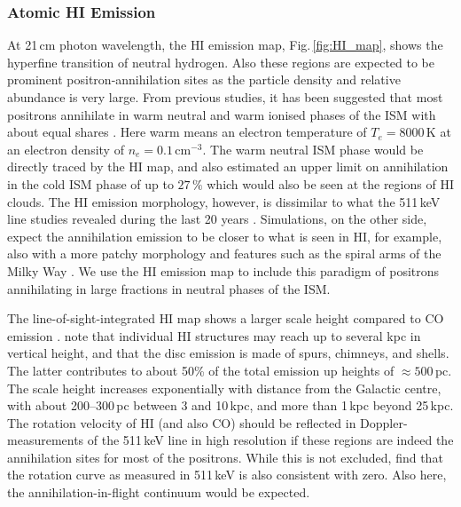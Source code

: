 \documentclass[doublespace,nopageskip]{VTthesis}
\newcommand{\mrm}[1]{\mathrm{#1}}
\begin{document}
\subsubsection{Atomic HI Emission}

At 21\,cm photon wavelength, the {HI} emission map, Fig.\,\ref{fig:HI_map}, shows the hyperfine transition of neutral hydrogen.
%
Also these regions are expected to be prominent positron-annihilation sites as the particle density and relative abundance is very large.
%
From previous studies, it has been suggested that most positrons annihilate in warm neutral and warm ionised phases of the ISM with about equal shares \citep{2006A&A...445..579J}.
%
Here warm means an electron temperature of $T_e = 8000\,\mrm{K}$ at an electron density of $n_e = 0.1\,\mrm{cm^{-3}}$.
%
The warm neutral ISM phase would be directly traced by the {HI} map, and \citet{2006A&A...445..579J} also estimated an upper limit on annihilation in the cold ISM phase of up to $27\,\%$ which would also be seen at the regions of {HI} clouds.
%
The {HI} emission morphology, however, is dissimilar to what the 511\,keV line studies revealed during the last 20 years \citep{1997ApJ...491..725P,2005A&A...441..513K,2016A&A...586A..84S,2019A&A...627A.126S,Skinner2014_511,2011MNRAS.411.1727C}.
%
Simulations, on the other side, expect the annihilation emission to be closer to what is seen in {HI}, for example, also with a more patchy morphology and features such as the spiral arms of the Milky Way \citep{2014A&A...564A.108A,2018Galax...6...39P}.
%
We use the {HI} emission map to include this paradigm of positrons annihilating in large fractions in neutral phases of the ISM. 

The line-of-sight-integrated {HI} map shows a larger scale height compared to {CO} emission \citep{1990ARA&A..28..215D}.
%
\citet{2009ARA&A..47...27K} note that individual {HI} structures may reach up to several kpc in vertical height, and that the disc emission is made of spurs, chimneys, and shells.
%
The latter contributes to about 50\% of the total emission up heights of $\approx 500$\,pc.
%
The scale height increases exponentially with distance from the Galactic centre, with about 200--300\,pc between 3 and 10\,kpc, and more than 1\,kpc beyond 25\,kpc.
%
The rotation velocity of {HI} (and also {CO}) should be reflected in Doppler-measurements of the 511\,keV line in high resolution if these regions are indeed the annihilation sites for most of the positrons.
%
While this is not excluded, \citet{2019A&A...627A.126S} find that the rotation curve as measured in 511\,keV is also consistent with zero.
%
Also here, the annihilation-in-flight continuum would be expected.
\end{document}
